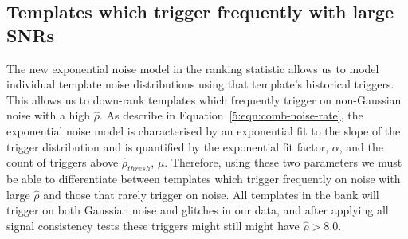 \subsection{\label{5:sec:poor-temp-fits}Templates which trigger frequently with large SNRs}



The new exponential noise model in the ranking statistic allows us to model individual template noise distributions using that template's historical triggers. This allows us to down-rank templates which frequently trigger on non-Gaussian noise with a high $\hat{\rho}$. As describe in Equation~\ref{5:eqn:comb-noise-rate}, the exponential noise model is characterised by an exponential fit to the slope of the trigger distribution and is quantified by the exponential fit factor, $\alpha$, and the count of triggers above $\hat{\rho}_{thresh}$, $\mu$. Therefore, using these two parameters we must be able to differentiate between templates which trigger frequently on noise with large $\hat{\rho}$ and those that rarely trigger on noise. All templates in the bank will trigger on both Gaussian noise and glitches in our data, and after applying all signal consistency tests these triggers might still might have $\hat{\rho} > 8.0$. 

